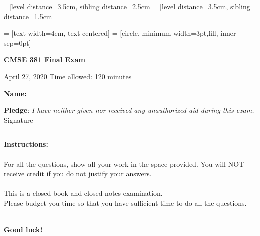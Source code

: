 \documentclass[11pt,letter]{exam}
\begin{document}
=[level distance=3.5cm, sibling distance=2.5cm]
=[level distance=3.5cm, sibling distance=1.5cm]

 = [text width=4em, text centered]
 = [circle, minimum width=3pt,fill, inner sep=0pt]

\CorrectChoiceEmphasis{\color{red}\bfseries}
\bracketedpoints
{}
\setlength\answerskip{0.05ex}

\begin{center}
{\Large {\bf CMSE 381  Final Exam} }
\end{center}
\vspace{1cm}

April 27, 2020 \hfill Time allowed: 120 minutes \vspace{1 cm}

{\bf Name: \underline {\hspace{2in}}} \hspace{1cm}

\vspace*{0.7in}

{\bf Pledge}: {\it I have neither given nor received any unauthorized aid during this exam.}
\vspace*{1.25cm}\\
Signature \rule{5cm}{.5mm}\vspace*{0.7in}

{\bf Instructions:}\\
\vspace*{.1in}
\\
For all the questions, show all your work in the space provided. You will NOT receive credit if you do not justify your answers. \\
\vspace*{.1in}\\
This is a closed book and closed notes examination.
\vspace*{.1in}\\
Please budget you time so that you have sufficient time to do all the  questions.


\mbox{}

\makebox[5.5in]{\hrulefill}\\



\vspace*{0.2in}
 {\bf Good luck!}
\newpage

\end{document}
